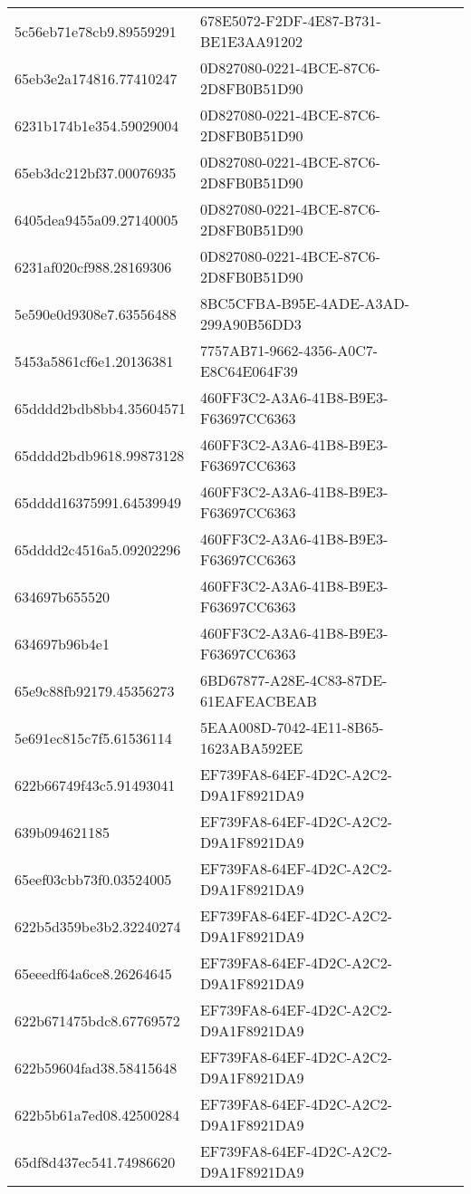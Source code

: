 \begin{tabular}{ll}
5c56eb71e78cb9.89559291 & 678E5072-F2DF-4E87-B731-BE1E3AA91202 \\
65eb3e2a174816.77410247 & 0D827080-0221-4BCE-87C6-2D8FB0B51D90 \\
6231b174b1e354.59029004 & 0D827080-0221-4BCE-87C6-2D8FB0B51D90 \\
65eb3dc212bf37.00076935 & 0D827080-0221-4BCE-87C6-2D8FB0B51D90 \\
6405dea9455a09.27140005 & 0D827080-0221-4BCE-87C6-2D8FB0B51D90 \\
6231af020cf988.28169306 & 0D827080-0221-4BCE-87C6-2D8FB0B51D90 \\
5e590e0d9308e7.63556488 & 8BC5CFBA-B95E-4ADE-A3AD-299A90B56DD3 \\
5453a5861cf6e1.20136381 & 7757AB71-9662-4356-A0C7-E8C64E064F39 \\
65dddd2bdb8bb4.35604571 & 460FF3C2-A3A6-41B8-B9E3-F63697CC6363 \\
65dddd2bdb9618.99873128 & 460FF3C2-A3A6-41B8-B9E3-F63697CC6363 \\
65dddd16375991.64539949 & 460FF3C2-A3A6-41B8-B9E3-F63697CC6363 \\
65dddd2c4516a5.09202296 & 460FF3C2-A3A6-41B8-B9E3-F63697CC6363 \\
634697b655520 & 460FF3C2-A3A6-41B8-B9E3-F63697CC6363 \\
634697b96b4e1 & 460FF3C2-A3A6-41B8-B9E3-F63697CC6363 \\
65e9c88fb92179.45356273 & 6BD67877-A28E-4C83-87DE-61EAFEACBEAB \\
5e691ec815c7f5.61536114 & 5EAA008D-7042-4E11-8B65-1623ABA592EE \\
622b66749f43c5.91493041 & EF739FA8-64EF-4D2C-A2C2-D9A1F8921DA9 \\
639b094621185 & EF739FA8-64EF-4D2C-A2C2-D9A1F8921DA9 \\
65eef03cbb73f0.03524005 & EF739FA8-64EF-4D2C-A2C2-D9A1F8921DA9 \\
622b5d359be3b2.32240274 & EF739FA8-64EF-4D2C-A2C2-D9A1F8921DA9 \\
65eeedf64a6ce8.26264645 & EF739FA8-64EF-4D2C-A2C2-D9A1F8921DA9 \\
622b671475bdc8.67769572 & EF739FA8-64EF-4D2C-A2C2-D9A1F8921DA9 \\
622b59604fad38.58415648 & EF739FA8-64EF-4D2C-A2C2-D9A1F8921DA9 \\
622b5b61a7ed08.42500284 & EF739FA8-64EF-4D2C-A2C2-D9A1F8921DA9 \\
65df8d437ec541.74986620 & EF739FA8-64EF-4D2C-A2C2-D9A1F8921DA9 \\

\end{tabular}
